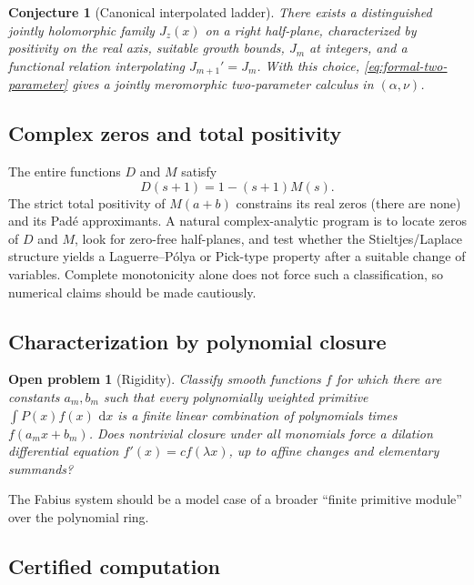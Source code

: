 \documentclass[11pt,oneside]{article}
\numberwithin{equation}{section}
\newtheorem{conjecture}[theorem]{Conjecture}
\newtheorem{problem}[theorem]{Open problem}
\theoremstyle{definition}
\theoremstyle{remark}
\newcommand{\dd}{\,\mathrm d}
\begin{document}
\begin{conjecture}[Canonical interpolated ladder]
There exists a distinguished jointly holomorphic family $J_z(x)$ on a right half-plane,
characterized by positivity on the real axis, suitable growth bounds, $J_m$ at integers, and
a functional relation interpolating $J_{m+1}'=J_m$.  With this choice,
\eqref{eq:formal-two-parameter} gives a jointly meromorphic two-parameter calculus in
$(\alpha,\nu)$.
\end{conjecture}

\subsection{Complex zeros and total positivity}

The entire functions $D$ and $M$ satisfy
\begin{equation}
 D(s+1)=1-(s+1)M(s).                                         \label{eq:D-M}
\end{equation}
The strict total positivity of $M(a+b)$ constrains its real zeros (there are none) and its
Pad\'e approximants.  A natural complex-analytic program is to locate zeros of $D$ and $M$,
look for zero-free half-planes, and test whether the Stieltjes/Laplace structure yields a
Laguerre--P\'olya or Pick-type property after a suitable change of variables.  Complete
monotonicity alone does not force such a classification, so numerical claims should be made
cautiously.

\subsection{Characterization by polynomial closure}

\begin{problem}[Rigidity]
Classify smooth functions $f$ for which there are constants $a_m,b_m$ such that every
polynomially weighted primitive $\int P(x)f(x)\,\dd x$ is a finite linear combination of
polynomials times $f(a_mx+b_m)$.  Does nontrivial closure under all monomials force a
dilation differential equation $f'(x)=cf(\lambda x)$, up to affine changes and elementary
summands?
\end{problem}

The Fabius system should be a model case of a broader ``finite primitive module'' over the
polynomial ring.

\subsection{Certified computation}
\end{document}
